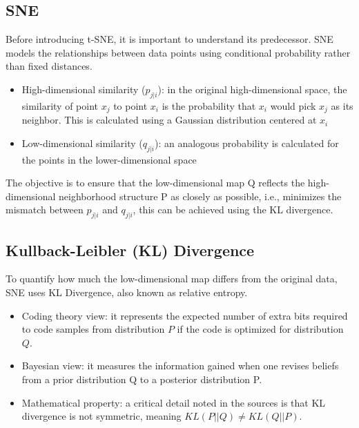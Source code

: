 \subsection{SNE}
Before introducing t-SNE, it is important to understand its predecessor. SNE models the relationships between data points using conditional probability rather than fixed distances. 
\begin{itemize}
    \item High-dimensional similarity (\(p_{j|i}\)): in the original high-dimensional space, the similarity of point \(x_j\) to point \(x_i\) is the probability that \(x_i\) would pick \(x_j\) as its neighbor. This is calculated using a Gaussian distribution centered at \(x_i\)
    \item Low-dimensional similarity (\(q_{j|i}\)): an analogous probability is calculated for the points in the lower-dimensional space
\end{itemize}
The objective is to ensure that the low-dimensional map Q reflects the high-dimensional neighborhood structure P as closely as possible, i.e., minimizes the mismatch between \(p_{j|i}\) and \(q_{j|i}\), this can be achieved using the KL divergence.

\subsection{Kullback-Leibler (KL) Divergence}
To quantify how much the low-dimensional map differs from the original data, SNE uses KL Divergence, also known as relative entropy.
\begin{itemize}
    \item Coding theory view: it represents the expected number of extra bits required to code samples from distribution \(P\) if the code is optimized for distribution \(Q\).
    \item Bayesian view: it measures the information gained when one revises beliefs from a prior distribution Q to a posterior distribution P.
    \item Mathematical property: a critical detail noted in the sources is that KL divergence is not symmetric, meaning \(KL(P||Q) \neq KL (Q||P)\).
\end{itemize}

